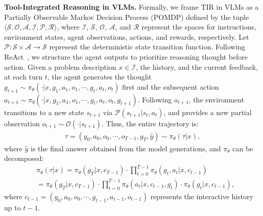 \noindent \textbf{Tool-Integrated Reasoning in VLMs.}
Formally, we frame TIR in VLMs as a Partially Observable Markov Decision Process (POMDP) defined by the tuple $\langle\mathcal{S},\mathcal{O},\mathcal{A},\mathcal{I},\mathcal{P},\mathcal{R}\rangle$, where
$\mathcal{I}$, $\mathcal{S}$, $\mathcal{O}$, $\mathcal{A}$, and $\mathcal{R}$ represent the spaces for instructions, environment states, agent observations, actions, and rewards, respectively.
Let $\mathcal{P}: \mathcal{S}\times\mathcal{A}\to\mathcal{S}$ represent the deterministic state transition function.
Following ReAct~\cite{yao2023react}, we structure the agent outputs to prioritize reasoning thought before action.
Given a problem description $x\in\mathcal{I}$, the history, and the current feedback, at each turn $t$, the agent generates the thought $g_{t+1}\sim\pi_\theta(\cdot|x,g_1,a_1,o_1,\cdots,g_t,a_t,o_t)$ first and the subsequent action $a_{t+1}\sim\pi_\theta(\cdot|x,g_1,a_1,o_1,\cdots,g_t,a_t,o_t,g_{t+1})$.
Following $a_{t+1}$, the environment transitions to a new state $s_{t+1}$ via $\mathcal{P}(s_{t+1}|s_t,a_t)$, and provides a new partial observation $o_{t+1}\sim\mathcal{O}(\cdot|s_{t+1})$.
Thus, the entire trajectory is:
\begin{equation*}
    \begin{aligned}
        \tau=(g_0,a_0,o_0,\cdots,o_{T-1},g_T,\hat{y})\sim\pi_\theta(\tau|x),
    \end{aligned}
\end{equation*}
where $\hat{y}$ is the final answer obtained from the model generations, and $\pi_\theta$ can be decomposed:
\begin{equation*}
    \begin{aligned}
        &\pi_\theta(\tau|x)=\pi_\theta(g_T|x,c_{T-1})\cdot\prod_{t=0}^{T-1}\pi_\theta(g_t,a_t|x,c_{t-1}) \\
        & =\pi_\theta(g_T|x,c_{T-1})\cdot\prod_{t=0}^{T-1}\pi_\theta(a_t|x,c_{t-1},g_t)\cdot\pi_\theta(g_t|x,c_{t-1}),
    \end{aligned}
\end{equation*}
where $c_{t-1}=(g_0,a_0,o_0,\cdots,g_{t-1},a_{t-1},o_{t-1})$ represents the interactive history up to $t-1$.

